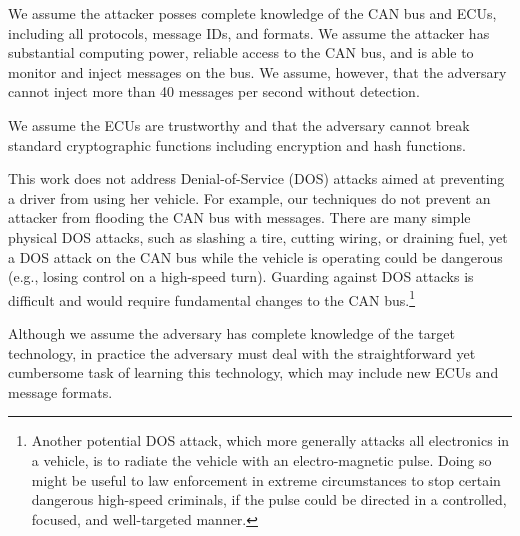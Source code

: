 We assume the attacker posses complete knowledge of the CAN bus and ECUs, including all protocols, message IDs, and formats.
We assume the attacker has substantial computing power, reliable access to the CAN bus, and is able to 
monitor and inject messages on the bus.  We assume, however, that the adversary cannot inject more than 40 messages
per second without detection.

We assume the ECUs are trustworthy and that the adversary cannot break standard cryptographic functions 
including encryption and hash functions.

This work does not address Denial-of-Service (DOS) attacks aimed at preventing a driver from using her vehicle.  
For example, our techniques do not prevent an attacker from flooding the CAN bus with messages.  There are many
simple physical DOS attacks, such as slashing a tire, cutting wiring, or draining fuel, yet
a DOS attack on the CAN bus while the vehicle is operating could be dangerous 
(e.g., losing control on a high-speed turn).  Guarding against DOS attacks is difficult and would require fundamental
changes to the CAN bus.\footnote{Another potential DOS attack, which more generally attacks
all electronics in a vehicle, is to radiate the vehicle with an electro-magnetic pulse.
Doing so might be useful to law enforcement in extreme circumstances to stop certain dangerous high-speed criminals, 
if the pulse could be directed in a controlled, focused, and well-targeted manner.}

Although we assume the adversary has complete knowledge of the target technology, in practice the adversary must
deal with the straightforward yet cumbersome task of learning this technology, which may include new ECUs and message formats.


